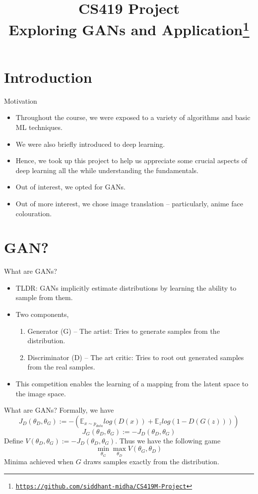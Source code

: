 \documentclass[handout]{beamer}
\title{CS419 Project \\ Exploring GANs and Application\footnote{\href{https://github.com/siddhant-midha/CS419M-Project}{\texttt{https://github.com/siddhant-midha/CS419M-Project}}}}
\author{}
\date{}
\begin{document}
\frame{\titlepage}
\section{Introduction}
\begin{frame}{Motivation}
    \begin{itemize}
        \item Throughout the course, we were exposed to a variety of algorithms and basic ML techniques. \pause
        \item We were also briefly introduced to deep learning.\pause
        \item Hence, we took up this project to help us appreciate some crucial aspects of deep learning all the while understanding the fundamentals.\pause
        \item Out of interest, we opted for GANs.\pause
        \item Out of more interest, we chose image translation -- particularly, anime face colouration.\pause

    \end{itemize}
\end{frame}
\section{GAN?}
\begin{frame}{What are GANs?}
    \begin{itemize}
        \item TLDR: GANs implicitly estimate distributions by learning the ability to sample from them.\pause
        \item Two components,\pause
        \begin{enumerate}
            \item Generator (G) -- The artist: Tries to generate samples from the distribution.\pause
            \item Discriminator (D) -- The art critic:  Tries to root out generated samples from the real samples. \pause
        \end{enumerate}
        \item This competition enables the learning of a mapping from the latent space to the image space.\pause
    \end{itemize}
\end{frame}
\begin{frame}{What are GANs?}
Formally, we have\pause
\[J_D(\theta_D,\theta_G) := -(\mathbb{E}_{x \sim p_{data}}log(D(x)) +\mathbb{E}_zlog(1 - D(G(z))))\]\pause
\[J_G(\theta_D,\theta_G) := -J_D(\theta_D,\theta_G)\]\pause
Define $V(\theta_D,\theta_G) := -J_D(\theta_D,\theta_G)$. \pause Thus we have the following game \pause
\[\min_{\theta_G}\max_{\theta_D}V(\theta_G,\theta_D)\]\pause
Minima achieved when $G$ draws samples exactly from the distribution.
\end{frame}
\end{document}
